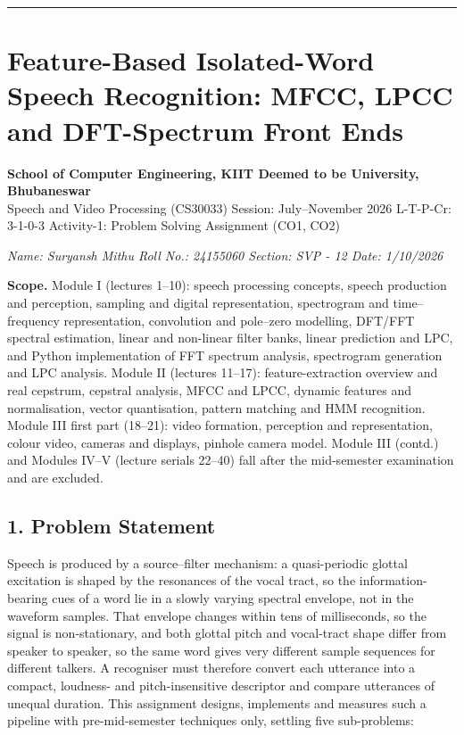 \documentclass[
]{article}
\author{}
\date{}
\begin{document}
\begin{center}\rule{0.5\linewidth}{0.5pt}\end{center}

\section{Feature-Based Isolated-Word Speech Recognition: MFCC, LPCC and
DFT-Spectrum Front
Ends}\label{feature-based-isolated-word-speech-recognition-mfcc-lpcc-and-dft-spectrum-front-ends}

\textbf{School of Computer Engineering, KIIT Deemed to be University,
Bhubaneswar}\\
Speech and Video Processing (CS30033) \textbar{} Session: July--November
2026 \textbar{} L-T-P-Cr: 3-1-0-3 \textbar{} Activity-1: Problem Solving
Assignment (CO1, CO2)

\emph{Name: Suryansh Mithu Roll No.: 24155060 Section: SVP - 12 Date:
1/10/2026}

\textbf{Scope.} Module I (lectures 1--10): speech processing concepts,
speech production and perception, sampling and digital representation,
spectrogram and time--frequency representation, convolution and
pole--zero modelling, DFT/FFT spectral estimation, linear and non-linear
filter banks, linear prediction and LPC, and Python implementation of
FFT spectrum analysis, spectrogram generation and LPC analysis. Module
II (lectures 11--17): feature-extraction overview and real cepstrum,
cepstral analysis, MFCC and LPCC, dynamic features and normalisation,
vector quantisation, pattern matching and HMM recognition. Module III
first part (18--21): video formation, perception and representation,
colour video, cameras and displays, pinhole camera model. Module III
(contd.) and Modules IV--V (lecture serials 22--40) fall after the
mid-semester examination and are excluded.

\subsection{1. Problem Statement}\label{1-problem-statement}

Speech is produced by a source--filter mechanism: a quasi-periodic
glottal excitation is shaped by the resonances of the vocal tract, so
the information-bearing cues of a word lie in a slowly varying spectral
envelope, not in the waveform samples. That envelope changes within tens
of milliseconds, so the signal is non-stationary, and both glottal pitch
and vocal-tract shape differ from speaker to speaker, so the same word
gives very different sample sequences for different talkers. A
recogniser must therefore convert each utterance into a compact,
loudness- and pitch-insensitive descriptor and compare utterances of
unequal duration. This assignment designs, implements and measures such
a pipeline with pre-mid-semester techniques only, settling five
sub-problems:
\end{document}

